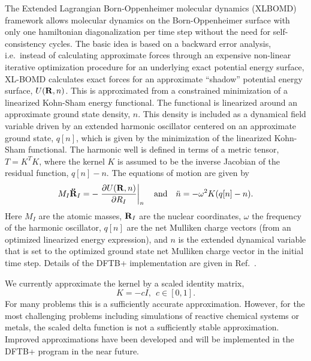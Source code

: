 \documentclass{revtex4-1}
\newcommand{\dftbp}{DFTB+}
\begin{document}
The Extended Lagrangian Born-Oppenheimer molecular dynamics (XLBOMD) framework
allows\cite{ANiklasson08, ANiklasson17} molecular dynamics on the
Born-Oppenheimer surface with only one hamiltonian diagonalization per time step without the
need for self-consistency cycles.  The basic idea is based on a backward error
analysis, i.e.\ instead of calculating approximate forces through an expensive
non-linear iterative optimization procedure for an underlying exact potential
energy surface, XL-BOMD calculates exact forces for an approximate ``shadow'' potential energy surface, $U({\bf R},n)$. This is approximated from a
constrained minimization of a linearized Kohn-Sham energy functional.\cite{ANiklasson14,ANiklasson17} The functional is linearized around an
approximate ground state density, $n$. This density is included as a dynamical
field variable driven by an extended harmonic oscillator centered on an approximate ground state, $q[n]$, which is given by the minimization of the linearized Kohn-Sham functional. The harmonic well is
defined in terms of a metric tensor, $T = K^T K$, where the kernel $K$ is
assumed to be the inverse Jacobian of the residual function, $q[n] - n$.\cite{ANiklasson17}  The equations of motion are given by
\begin{equation}
  M_I{{\bf \ddot R}}_I = -\left. \frac{\partial U({\bf R},n)}{\partial
    R_I}\right \vert_n \quad \text{and} \quad {\ddot n} = -\omega^2 K(q[n] - n).
\end{equation}
Here $M_I$ are the atomic masses, ${\bf R}_I$ are the nuclear coordinates, $\omega$ the frequency of the harmonic oscillator, $q[n]$ are the net Mulliken charge vectors (from an optimized linearized energy expression), and $n$ is the extended dynamical
variable that is set to the optimized ground state net Mulliken charge vector in
the initial time step. Details of the \dftbp{} implementation are given in
Ref.~.

We currently approximate the kernel by a scaled
identity matrix,
\begin{equation}
  K = -cI, ~~ c\in [0,1].
\end{equation}
For many problems this is a sufficiently accurate approximation. However, for
the most challenging problems including simulations of reactive chemical systems
or metals, the scaled delta function is not a sufficiently stable
approximation. Improved approximations have been developed \cite{ANiklasson17}
and will be implemented in the \dftbp{} program in the near future.
\end{document}
